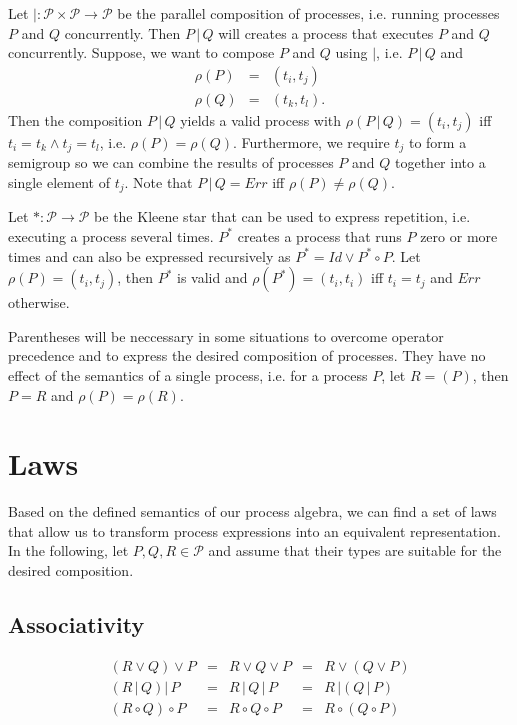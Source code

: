 Let $| \colon \mathcal{P} \times \mathcal{P} \to \mathcal{P}$ be the parallel composition of processes, i.e. running processes $P$ and $Q$ concurrently. Then $P \,|\, Q$ will creates a process that executes $P$ and $Q$ concurrently. Suppose, we want to compose $P$ and $Q$ using $|$, i.e. $P \,|\, Q$ and
\begin{eqnarray*}
  \rho \left( P \right) & = & \left( t_i, t_j \right) \\
  \rho \left( Q \right) & = & \left( t_k, t_l \right).
\end{eqnarray*}
Then the composition $P \,|\, Q$ yields a valid process with $\rho \left( P \,|\, Q \right) = \left( t_i, t_j \right)$ iff $t_i = t_k \wedge t_j = t_l$, i.e. $\rho \left( P \right) = \rho \left( Q \right)$. Furthermore, we require $t_j$ to form a semigroup so we can combine the results of processes $P$ and $Q$ together into a single element of $t_j$. Note that $P \,|\, Q = Err$ iff $\rho \left( P \right) \neq \rho \left( Q \right)$.

Let $* \colon \mathcal{P} \to \mathcal{P}$ be the Kleene star that can be used to express repetition, i.e. executing a process several times. $P^*$ creates a process that runs $P$ zero or more times and can also be expressed recursively as $P^* = Id \vee P^* \circ P$. Let $\rho \left( P \right) = \left( t_i, t_j \right)$, then $P^*$ is valid and $\rho \left( P^* \right) = \left( t_i, t_i \right)$ iff $t_i = t_j$ and $Err$ otherwise.

Parentheses will be neccessary in some situations to overcome operator precedence and to express the desired composition of processes. They have no effect of the semantics of a single process, i.e. for a process $P$, let $R = \left( P \right)$, then $P = R$ and $\rho \left( P \right) = \rho \left( R \right)$.

\section{Laws}
Based on the defined semantics of our process algebra, we can find a set of laws that allow us to transform process expressions into an equivalent representation. In the following, let $P, Q, R \in \mathcal{P}$ and assume that their types are suitable for the desired composition.

\subsection{Associativity}
\begin{equation*}
\begin{array}{rcccl}
  \left( R \vee Q \right) \vee P & = & R \vee Q \vee P & = & R \vee \left( Q \vee P \right) \\
  \left( R \,|\, Q \right) |\, P & = & R \,|\, Q \,|\, P & = & R \,| \left( Q \,|\, P \right) \\
  \left( R \circ Q \right) \circ P & = & R \circ Q \circ P & = & R \circ \left( Q \circ P \right)
\end{array}
\end{equation*}

